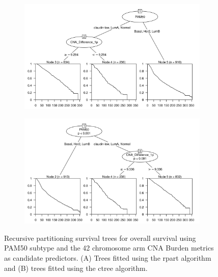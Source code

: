 \begin{figure}[!htb]
\centering

\vspace{0.5cm}

\begin{subfigure}{\textwidth}
\subcaption{}
\includegraphics[width=1\textwidth]{../figures/Appendices/Appendix_B/PA_PartyKit_Survival_Burden_OS_PAM50.png}
\end{subfigure}

\vspace{2cm}

\begin{subfigure}{\textwidth}
\subcaption{}
\includegraphics[width=1\textwidth]{../figures/Appendices/Appendix_B/PA_Ctree_Survival_Burden_OS_PAM50.png}
\end{subfigure}

\vspace{0.5cm}

\caption[Recursive partitioning survival trees for overall survival using PAM50 subtype and the 42 chromosome arm CNA Burden metrics as candidate predictors.]{Recursive partitioning survival trees for overall survival using PAM50 subtype and the 42 chromosome arm CNA Burden metrics as candidate predictors. (A) Trees fitted using the rpart algorithm and (B) trees fitted using the ctree algorithm.}
\end{figure}

